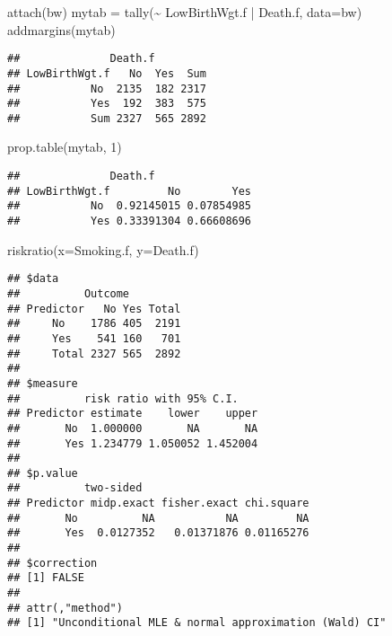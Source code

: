 \documentclass[
]{article}
\newenvironment{Shaded}{\begin{snugshade}}{\end{snugshade}}
\newcommand{\AttributeTok}[1]{\textcolor[rgb]{0.77,0.63,0.00}{#1}}
\newcommand{\DecValTok}[1]{\textcolor[rgb]{0.00,0.00,0.81}{#1}}
\newcommand{\FunctionTok}[1]{\textcolor[rgb]{0.00,0.00,0.00}{#1}}
\newcommand{\NormalTok}[1]{#1}
\newcommand{\OtherTok}[1]{\textcolor[rgb]{0.56,0.35,0.01}{#1}}
\newcommand{\SpecialCharTok}[1]{\textcolor[rgb]{0.00,0.00,0.00}{#1}}
\begin{document}
\begin{Shaded}
\begin{Highlighting}[]
\FunctionTok{attach}\NormalTok{(bw)}
\NormalTok{mytab }\OtherTok{=} \FunctionTok{tally}\NormalTok{(}\SpecialCharTok{\textasciitilde{}}\NormalTok{ LowBirthWgt.f }\SpecialCharTok{|}\NormalTok{ Death.f, }\AttributeTok{data=}\NormalTok{bw)}
\FunctionTok{addmargins}\NormalTok{(mytab)}
\end{Highlighting}
\end{Shaded}

\begin{verbatim}
##              Death.f
## LowBirthWgt.f   No  Yes  Sum
##           No  2135  182 2317
##           Yes  192  383  575
##           Sum 2327  565 2892
\end{verbatim}

\begin{Shaded}
\begin{Highlighting}[]
\FunctionTok{prop.table}\NormalTok{(mytab, }\DecValTok{1}\NormalTok{)}
\end{Highlighting}
\end{Shaded}

\begin{verbatim}
##              Death.f
## LowBirthWgt.f         No        Yes
##           No  0.92145015 0.07854985
##           Yes 0.33391304 0.66608696
\end{verbatim}

\begin{Shaded}
\begin{Highlighting}[]
\FunctionTok{riskratio}\NormalTok{(}\AttributeTok{x=}\NormalTok{Smoking.f, }\AttributeTok{y=}\NormalTok{Death.f)}
\end{Highlighting}
\end{Shaded}

\begin{verbatim}
## $data
##          Outcome
## Predictor   No Yes Total
##     No    1786 405  2191
##     Yes    541 160   701
##     Total 2327 565  2892
## 
## $measure
##          risk ratio with 95% C.I.
## Predictor estimate    lower    upper
##       No  1.000000       NA       NA
##       Yes 1.234779 1.050052 1.452004
## 
## $p.value
##          two-sided
## Predictor midp.exact fisher.exact chi.square
##       No          NA           NA         NA
##       Yes  0.0127352   0.01371876 0.01165276
## 
## $correction
## [1] FALSE
## 
## attr(,"method")
## [1] "Unconditional MLE & normal approximation (Wald) CI"
\end{verbatim}
\end{document}
